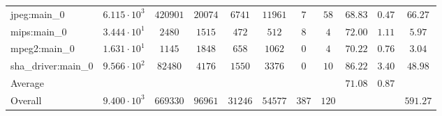 \begin{tabular}{|l|c|c|c|c|c|c|c|c|c|c|}
jpeg:main\_0            & $ 6.115 \cdot 10^{3} $ & $ 420901 $ & $ 20074 $ & $ 6741  $ & $ 11961 $ & $ 7   $ & $ 58  $ & $ 68.83       $ & $ 0.47    $ & $ 66.27   $ \\
mips:main\_0            & $ 3.444 \cdot 10^{1} $ & $ 2480   $ & $ 1515  $ & $ 472   $ & $ 512   $ & $ 8   $ & $ 4   $ & $ 72.00       $ & $ 1.11    $ & $ 5.97    $ \\
mpeg2:main\_0           & $ 1.631 \cdot 10^{1} $ & $ 1145   $ & $ 1848  $ & $ 658   $ & $ 1062  $ & $ 0   $ & $ 4   $ & $ 70.22       $ & $ 0.76    $ & $ 3.04    $ \\
sha\_driver:main\_0     & $ 9.566 \cdot 10^{2} $ & $ 82480  $ & $ 4176  $ & $ 1550  $ & $ 3376  $ & $ 0   $ & $ 10  $ & $ 86.22       $ & $ 3.40    $ & $ 48.98   $ \\
\hline
Average                 & $                    $ & $        $ & $       $ & $       $ & $       $ & $     $ & $     $ & $ 71.08       $ & $ 0.87    $ & $         $ \\
\hline
Overall                 & $ 9.400 \cdot 10^{3} $ & $ 669330 $ & $ 96961 $ & $ 31246 $ & $ 54577 $ & $ 387 $ & $ 120 $ & $             $ & $         $ & $ 591.27  $ \\
\hline
\end{tabular}
